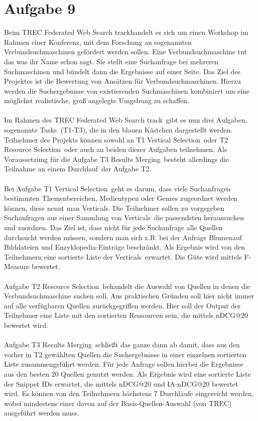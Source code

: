 \newpage
\section*{Aufgabe 9}

Beim \glqq TREC Federated Web Search track\grqq  handelt es sich um einen Workshop im Rahmen einer Konferenz, mit dem Forschung an sogenannten Verbundsuchmaschinen gefördert werden sollen. Eine Verbundsuchmaschine tut das was ihr Name schon sagt. Sie stellt eine Suchanfrage bei mehreren Suchmaschinen und bündelt dann die Ergebnisse auf einer Seite. Das Ziel des Projektes ist die Bewertung von Ansätzen für Verbundsuchmaschinen. Hierzu werden die Suchergebnisse von existierenden Suchmaschinen kombiniert um eine möglichst realistische, groß angelegte Umgebung zu schaffen.\\
\ \\
Im Rahmen des \glqq TREC Federated Web Search track\grqq\ gibt es nun drei Aufgaben, sogenannte \glqq Tasks\grqq\ (T1-T3), die in den blauen Kästchen dargestellt werden. Teilnehmer des Projekts können sowohl an T1 \glqq Vertical Selection\grqq\ oder T2 \glqq Resource Selection\grqq\ oder auch an beiden dieser Aufgaben teilnehmen. Als Voraussetzung für die Aufgabe T3 \glqq Results Merging\grqq\ besteht allerdings die Teilnahme an einem \glqq Durchlauf\grqq\ der Aufgabe T2.\\
\ \\
Bei Aufgabe T1 \glqq Vertical Selection\grqq\ geht es darum, dass viele Suchanfragen bestimmten Themenbereichen, Medientypen oder Genres zugeordnet werden können, diese nennt man \glqq Verticals\grqq . Die Teilnehmer sollen zu vorgegeben Suchanfragen aus einer Sammlung von \glqq Verticals\grqq\ die passendsten heraussuchen und zuordnen. Das Ziel ist, dass nicht für jede Suchanfrage alle Quellen durchsucht werden müssen, sondern man sich z.B. bei der Anfrage \glqq Blumen\grqq auf Bilddateien und Enzyklopedia-Einträge beschränkt. Als Ergebnis wird von den Teilnehmern eine sortierte Liste der \glqq Verticals\grqq\ erwartet. Die Güte wird mittels F-Measure bewertet.\\
\ \\
Aufgabe T2 \glqq Resource Selection\grqq\ behandelt die Auswahl von Quellen in denen die Verbundsuchmaschine suchen soll. Aus praktischen Gründen soll hier nicht immer auf alle verfügbaren Quellen zurückgegriffen werden. Hier soll der Output der Teilnehmer eine Liste mit den sortierten Ressourcen sein, die mittels nDCG@20 bewertet wird.\\
\ \\
Aufgabe T3 \glqq Results Merging\grqq\ schließt das ganze dann ab damit, dass aus den vorher in T2 gewählten Quellen die Suchergebnisse in einer einzelnen sortierten Liste zusammengeführt werden. Für jede Anfrage sollen hierbei die Ergebnisse aus den besten 20 Quellen genutzt werden. Als Ergebnis wird eine sortierte Liste der Snippet IDs erwartet, die mittels nDCG@20 und IA-nDCG@20 bewertet wird. Es können von den Teilnehmern höchstens 7 Durchläufe eingereicht werden, wobei mindestens einer davon auf der Basis-Quellen-Auswahl (von TREC) ausgeführt werden muss.